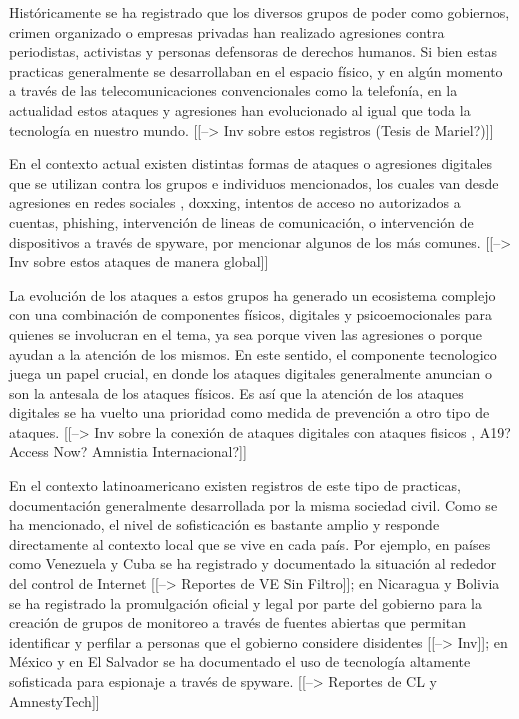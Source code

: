 \documentclass[12pt]{caltech_thesis}
\begin{document}
Históricamente se ha registrado que los diversos grupos de poder como gobiernos, crimen organizado o empresas privadas han realizado agresiones contra periodistas, activistas y personas defensoras de derechos humanos. Si bien estas practicas generalmente se desarrollaban en el espacio físico, y en algún momento a través de las telecomunicaciones convencionales como la telefonía, en la actualidad estos ataques y agresiones han evolucionado al igual que toda la tecnología en nuestro mundo. [[--> Inv sobre estos registros (Tesis de Mariel?)]]

En el contexto actual existen distintas formas de ataques o agresiones digitales que se utilizan contra los grupos e individuos mencionados, los cuales van desde agresiones en redes sociales , doxxing, intentos de acceso no autorizados a cuentas, phishing, intervención de lineas de comunicación, o intervención de dispositivos a través de spyware, por mencionar algunos de los más comunes. [[--> Inv sobre estos ataques de manera global]]

La evolución de los ataques a estos grupos ha generado un ecosistema complejo con una combinación de componentes físicos, digitales y psicoemocionales para quienes se involucran en el tema, ya sea porque viven las agresiones o porque ayudan a la atención de los mismos. En este sentido, el componente tecnologico juega un papel crucial, en donde los ataques digitales generalmente anuncian o son la antesala de los ataques físicos. Es así que la atención de los ataques digitales se ha vuelto una prioridad como medida de prevención a otro tipo de ataques. [[--> Inv sobre la conexión de ataques digitales con ataques fisicos , A19? Access Now? Amnistia Internacional?]]

En el contexto latinoamericano existen registros de este tipo de practicas, documentación generalmente desarrollada por la misma sociedad civil. Como se ha mencionado, el nivel de sofisticación es bastante amplio y responde directamente al contexto local que se vive en cada país. Por ejemplo, en países como Venezuela y Cuba se ha registrado y documentado la situación al rededor del control de Internet [[--> Reportes de VE Sin Filtro]]; en Nicaragua y Bolivia se ha registrado la promulgación oficial y legal por parte del gobierno para la creación de grupos de monitoreo a través de fuentes abiertas que permitan identificar y perfilar a personas que el gobierno considere disidentes [[--> Inv]]; en México y en El Salvador se ha documentado el uso de tecnología altamente sofisticada para espionaje a través de spyware. [[--> Reportes de CL y AmnestyTech]]
\end{document}
